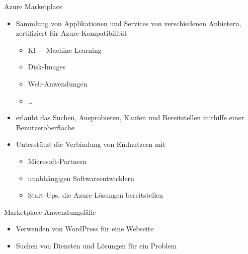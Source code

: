 \begin{flashcard}[Definition]{Azure Marketplace}
    \begin{itemize}
        \item Sammlung von Applikationen und Services\newline
        von verschiedenen Anbietern, zertifiziert für Azure-Kompatibilität
        \begin{itemize}
            \item KI + Machine Learning
            \item Disk-Images
            \item Web-Anwendungen
            \item \ldots
        \end{itemize}
        \item erlaubt das Suchen, Ausprobieren, Kaufen und Bereitstellen mithilfe einer Benutzeroberfläche
        \item Unterstützt die Verbindung von Endnutzern mit
        \begin{itemize}
            \item Microsoft-Partnern
            \item unabhängigen Softwareentwicklern
            \item Start-Ups, die Azure-Lösungen bereitstellen
        \end{itemize}
    \end{itemize}
\end{flashcard}

\begin{flashcard}[\ ]{Marketplace-Anwendungsfälle}
        \begin{itemize}
            \item Verwenden von WordPress für eine Webseite
            \item Suchen von Diensten und Lösungen für ein Problem
        \end{itemize}
\end{flashcard}

